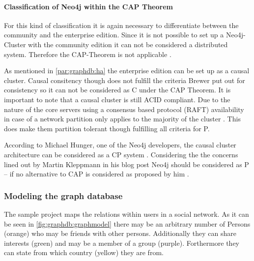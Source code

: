 \paragraph{Classification of Neo4j within the CAP Theorem} For this kind of classification it is again necessary to differentiate between the community and the enterprise edition.
Since it is not possible to set up a Neo4j-Cluster with the community edition it can not be considered a distributed system.
Therefore the CAP-Theorem is not applicable \autocite{dzone:understanding_cap}.

As mentioned in \autoref{par:graphdb:ha} the enterprise edition can be set up as a causal cluster.
Causal consitency though does not fulfill the criteria Brewer put out for consistency \autocite{DBLP:journals/corr/Kleppmann15} so it can not be considered as \glqq C\grqq{} under the CAP Theorem.
It is important to note that a causal cluster is still ACID compliant.
Due to the nature of the core servers using a consensus based protocol (RAFT) availability in case of a network partition only applies to the majority of the cluster \autocite{infoq:neo4j}.
This does make them partition tolerant though fulfilling all criteria for \glqq P\grqq.

According to Michael Hunger, one of the Neo4j developers, the causal cluster architecture can be considered as a \glqq CP\grqq{} system \autocite{infoq:neo4j}.
Considering the the concerns lined out by Martin Kleppmann in his blog post \autocite{kleppmann:caprant} Neo4j should be considered as \glqq P\grqq{} -- if no alternative to CAP is considered as proposed by him \autocite{DBLP:journals/corr/Kleppmann15}.


\subsubsection{Modeling the graph database}
The sample project maps the relations within users in a social network.
As it can be seen in \autoref{fig:graphdb:graphmodel} there may be an arbitrary number of Persons (orange) who may be friends with other persons.
Additionally they can share interests (green) and may be a member of a group (purple).
Forthermore they can state from which country (yellow) they are from.

